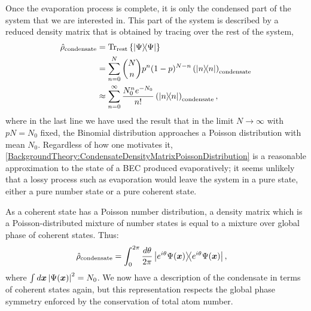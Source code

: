 Once the evaporation process is complete, it is only the condensed part of the system that we are interested in.  This part of the system is described by a reduced density matrix that is obtained by tracing over the rest of the system,
\begin{align}
    \hat{\rho}_\text{condensate} &= \Tr_\text{rest}\left\{ \ketbra{\Psi}{\Psi} \right\} \notag \\
     &= \sum_{n=0}^{N} {N \choose n} p^n (1-p)^{N-n} \left(\ketbra{n}{n}\right)_\text{condensate} \notag \\
     &\approx \sum_{n=0}^{\infty} \frac{N_0^n e^{- N_0}}{n!} \left(\ketbra{n}{n} \right)_\text{condensate}, \label{BackgroundTheory:CondensateDensityMatrixPoissonDistribution}
\end{align}
where in the last line we have used the result that in the limit $N\rightarrow \infty$ with $p N = N_0$ fixed, the Binomial distribution approaches a Poisson distribution with mean $N_0$.  Regardless of how one motivates it, \eqref{BackgroundTheory:CondensateDensityMatrixPoissonDistribution} is a reasonable approximation to the state of a BEC produced evaporatively;  it seems unlikely that a lossy process such as evaporation would leave the system in a pure state, either a pure number state or a pure coherent state.  

As a coherent state has a Poisson number distribution, a density matrix which is a Poisson-distributed mixture of number states is equal to a mixture over global phase of coherent states.  Thus:
\begin{align}
    \hat{\rho}_\text{condensate} &= \int_0^{2\pi} \frac{d\theta}{2\pi} \ketbra{e^{i \theta} \Psi(\vect{x})}{e^{i \theta} \Psi(\vect{x})}, \label{BackgroundTheory:CondensateDensityMatrixCoherentStateMixture}
\end{align}
where $\int d \bm{x} \left|\Psi(\bm{x})\right|^2 = N_0$.  We now have a description of the condensate in terms of coherent states again, but this representation respects the global phase symmetry enforced by the conservation of total atom number.  

